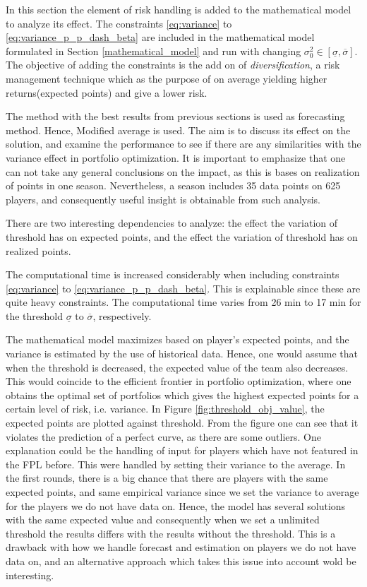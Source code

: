 In this section the element of risk handling is added to the mathematical model to analyze its effect. The constraints \ref{eq:variance} to \ref{eq:variance_p_p_dash_beta} are included in the mathematical model formulated in Section \ref{mathematical_model} and run with changing $\sigma_{0}^2 \in [\underline{\sigma}, \overline{\sigma}]$. The objective of adding the constraints is the add on of \textit{diversification}, a risk management technique which as the purpose of on average yielding higher returns(expected points) and give a lower risk.

\newpar

The method with the best results from previous sections is used as forecasting method. Hence, Modified average is used. The aim is to discuss its effect on the solution, and examine the performance to see if there are any similarities with the variance effect in portfolio optimization. It is important to emphasize that one can not take any general conclusions on the impact, as this is bases on realization of points in one season. Nevertheless, a season includes 35 data points on 625 players, and consequently useful insight is obtainable from such analysis.  

\newpar

There are two interesting dependencies to analyze: the effect the variation of threshold has on expected points, and the effect the variation of threshold has on realized points.

\newpar

The computational time is increased considerably when including constraints \ref{eq:variance} to \ref{eq:variance_p_p_dash_beta}. This is explainable since these are quite heavy constraints. The computational time varies from 26 min to 17 min for the threshold $\underline{\sigma}$ to $\overline{\sigma}$, respectively. 

\newpar

The mathematical model maximizes based on player's expected points, and the variance is estimated by the use of historical data. Hence, one would assume that when the threshold is decreased, the expected value of the team also decreases. This would coincide to the efficient frontier in portfolio optimization, where one obtains the optimal set of portfolios which gives the highest expected points for a certain level of risk, i.e. variance. In Figure \ref{fig:threshold_obj_value}, the expected points are plotted against threshold. From the figure one can see that it violates the prediction of a perfect curve, as there are some outliers. One explanation could be the handling of input for players which have not featured in the FPL before. This were handled by setting their variance to the average. In the first rounds, there is a big chance that there are players with the same expected points, and same empirical variance since we set the variance to average for the players we do not have data on. Hence, the model has several solutions with the same expected value and consequently when we set a unlimited threshold the results differs with the results without the threshold. This is a drawback with how we handle forecast and estimation on players we do not have data on, and an alternative approach which takes this issue into account wold be interesting. 

